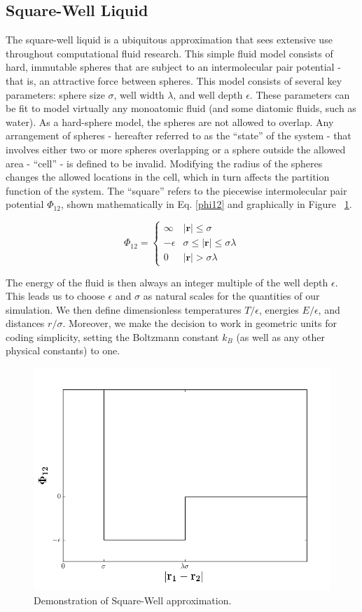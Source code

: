 \documentclass[12pt]{article}
\renewcommand{\vec}[1]{\mathbf{#1}}
\begin{document}
\subsection{Square-Well Liquid}
The square-well liquid is a ubiquitous approximation that sees extensive use throughout computational fluid research. This simple fluid model consists of hard, immutable spheres that are subject to an intermolecular pair potential - that is, an attractive force between spheres. This model consists of several key parameters: sphere size $\sigma$, well width $\lambda$, and well depth $\epsilon$. These parameters can be fit to model virtually any monoatomic fluid (and some diatomic fluids, such as water). 
 As a hard-sphere model, the spheres are not allowed to overlap. Any arrangement of spheres - hereafter referred to as the ``state'' of the system - that involves either two or more spheres overlapping or a sphere outside the allowed area - ``cell'' - is defined to be invalid. Modifying the radius of the spheres changes the allowed locations in the cell, which in turn affects the partition function of the system. The ``square'' refers to the piecewise intermolecular pair potential $\Phi_{12}$, shown mathematically in Eq. \ref{phi12} and graphically in Figure ~\ref{sw_phi}.

\begin{equation} 
\Phi_{12} = \begin{cases}\infty & |\vec{r}|\leq \sigma\\ -\epsilon & \sigma \leq |\vec{r}| \leq \sigma\lambda\\ 0 & |\vec{r}| > \sigma\lambda \end{cases}
\label{phi12}
\end{equation}

The energy of the fluid is then always an integer multiple of the well depth $\epsilon$. This leads us to choose $\epsilon$ and $\sigma$ as natural scales for the quantities of our simulation. We then define dimensionless temperatures $T/\epsilon$, energies $E/\epsilon$, and distances $r/\sigma$. Moreover, we make the decision to work in geometric units for coding simplicity, setting the Boltzmann constant $k_B$ (as well as any other physical constants) to one.

\begin{figure}
    \centering
    \includegraphics[width=.75\textwidth]{SWF-E.png}
    \caption{Demonstration of Square-Well approximation.}
    \label{sw_phi}
\end{figure}
\end{document}
